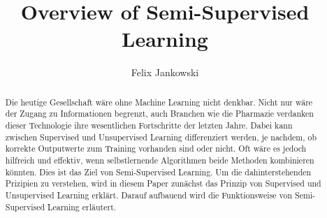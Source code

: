 \documentclass[runningheads,a4paper]{llncs}
\begin{document}







\title{Overview of Semi-Supervised Learning}

\author{Felix Jankowski}

%

\maketitle

\begin{abstract}
Die heutige Gesellschaft wäre ohne Machine Learning nicht denkbar. Nicht nur wäre der Zugang zu Informationen begrenzt, auch Branchen wie die Pharmazie verdanken dieser Technologie ihre wesentlichen Fortschritte der letzten Jahre.
Dabei kann zwischen Supervised und Unsupervised Learning differenziert werden, je nachdem, ob korrekte Outputwerte zum Training vorhanden sind oder nicht.
Oft wäre es jedoch hilfreich und effektiv, wenn selbstlernende Algorithmen  beide Methoden kombinieren könnten. Dies ist das Ziel von Semi-Supervised Learning. Um die dahinterstehenden Prizipien zu verstehen, wird in diesem Paper zunächst das Prinzip von Supervised und Unsupervised Learning erklärt. Darauf aufbauend wird die Funktionsweise von Semi-Supervised Learning erläutert.\end{abstract}




\end{document}
